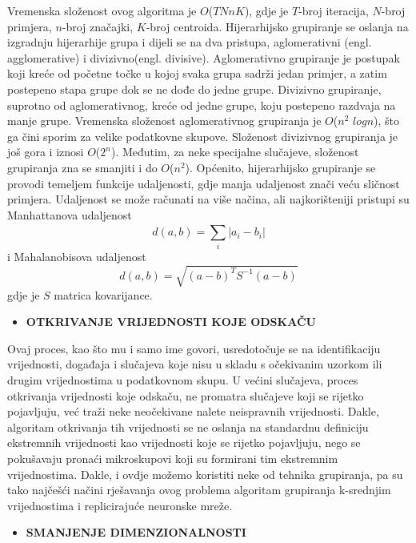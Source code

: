 \documentclass[times, utf8, zavrsni, numeric]{fer}
\begin{document}
Vremenska složenost ovog algoritma je $O$($TNnK$), gdje je $T$-broj iteracija, $N$-broj primjera, $n$-broj značajki, $K$-broj centroida.
Hijerarhijsko grupiranje se oslanja na izgradnju hijerarhije grupa i dijeli se na dva pristupa, aglomerativni (engl. agglomerative) i divizivno(engl. divisive). Aglomerativno grupiranje je postupak koji kreće od početne točke u kojoj svaka grupa sadrži jedan primjer, a zatim postepeno stapa grupe dok se ne dođe do jedne grupe. Divizivno grupiranje, suprotno od aglomerativnog, kreće od jedne grupe, koju postepeno razdvaja na manje grupe. Vremenska složenost aglomerativnog grupiranja je $O$($n^2$ $logn$), što ga čini sporim za velike podatkovne skupove. Složenost divizivnog grupiranja je još gora i iznosi $O$($2^n$). Međutim, za neke specijalne slučajeve, složenost grupiranja zna se smanjiti i do $O$($n^2$). Općenito, hijerarhijsko grupiranje se provodi temeljem funkcije udaljenosti, gdje manja udaljenost znači veću sličnost primjera. Udaljenost se može računati na više načina, ali najkorišteniji pristupi su Manhattanova udaljenost 
\begin{equation}
d(a,b)=\sum_{i}^{}|a_i-b_i|
\end{equation}
i Mahalanobisova udaljenost
\begin{equation}
d(a,b) = \sqrt{(a-b)^TS^{-1}(a-b)}
\end{equation}
gdje je $S$ matrica kovarijance.
\begin{itemize}
\item \textbf{OTKRIVANJE VRIJEDNOSTI KOJE ODSKAČU}
\end{itemize}
Ovaj proces, kao što mu i samo ime govori, usredotočuje se na identifikaciju vrijednosti, događaja i slučajeva koje nisu u skladu s očekivanim uzorkom ili drugim vrijednostima u podatkovnom skupu. U većini slučajeva, proces otkrivanja vrijednosti koje odskaču, ne promatra slučajeve koji se rijetko pojavljuju, već traži neke neočekivane nalete neispravnih vrijednosti. Dakle, algoritam otkrivanja tih vrijednosti se ne oslanja na standardnu definiciju ekstremnih vrijednosti kao vrijednosti koje se rijetko pojavljuju, nego se pokušavaju pronaći mikroskupovi koji su formirani tim ekstremnim vrijednostima. Dakle, i ovdje možemo koristiti neke od tehnika grupiranja, pa su tako najčešći načini rješavanja ovog problema algoritam grupiranja k-srednjim vrijednostima i replicirajuće neuronske mreže.
\begin{itemize}
\item \textbf{SMANJENJE DIMENZIONALNOSTI}
\end{itemize}
\end{document}
